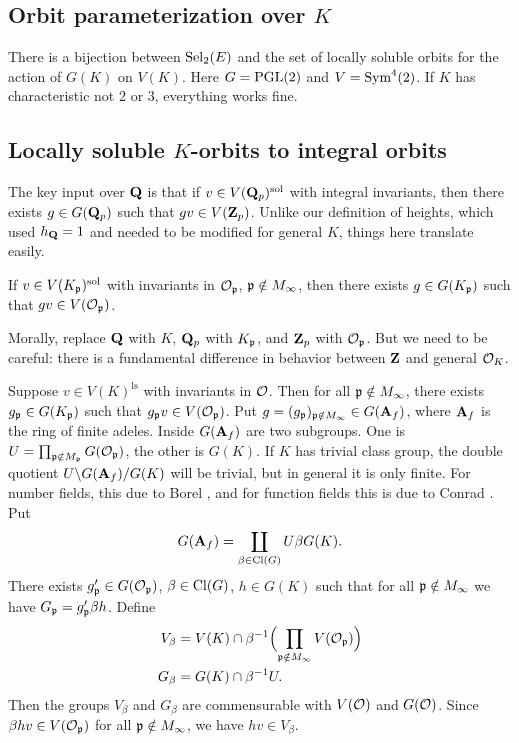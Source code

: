 \subsection{Orbit parameterization over \texorpdfstring{$K$}{K}}

There is a bijection between $\operatorname{Sel}_2(E)$ and the set of locally soluble 
orbits for the action of $G(K)$ on $V(K)$. Here $G=\operatorname{PGL}(2)$ 
and $V=\operatorname{Sym}^4(2)$. If $K$ has characteristic not $2$ or $3$, everything 
works fine. 





\subsection{Locally soluble \texorpdfstring{$K$}{K}-orbits to integral orbits}

The key input over $\mathbf{Q}$ is that if $v\in V(\mathbf{Q}_p)^\mathrm{sol}$ with integral 
invariants, then there exists $g\in G(\mathbf{Q}_p)$ such that $g v\in V(\mathbf{Z}_p)$. 
Unlike our definition of heights, which used $h_{\mathbf{Q}}=1$ and needed to be 
modified for general $K$, things here translate easily. 

\begin{lemm}
If $v\in V(K_{\mathfrak{p}})^\mathrm{sol}$ with invariants in $\mathcal{O}_{\mathfrak{p}}$, 
$\mathfrak{p}\notin M_\infty$, then there exists $g\in G(K_{\mathfrak{p}})$ such that 
$g v\in V(\mathcal{O}_{\mathfrak{p}})$. 
\end{lemm}

Morally, replace $\mathbf{Q}$ with $K$, $\mathbf{Q}_p$ with $K_{\mathfrak{p}}$, and $\mathbf{Z}_p$ with 
$\mathcal{O}_{\mathfrak{p}}$. But we need to be careful: there is a fundamental difference in 
behavior between $\mathbf{Z}$ and general $\mathcal{O}_K$. 

Suppose $v\in V(K)^\mathrm{ls}$ with invariants in $\mathcal{O}$. Then for all 
$\mathfrak{p}\notin M_\infty$, there exists $g_{\mathfrak{p}}\in G(K_{\mathfrak{p}})$ such that 
$g_{\mathfrak{p}} v\in V(\mathcal{O}_{\mathfrak{p}})$. Put $g=(g_{\mathfrak{p}})_{\mathfrak{p}\notin M_\infty}\in G(\mathbf{A}_f)$, 
where $\mathbf{A}_f$ is the ring of finite adeles. Inside $G(\mathbf{A}_f)$ are two 
subgroups. One is $U=\prod_{\mathfrak{p}\notin M_{\mathfrak{p}}} G(\mathcal{O}_{\mathfrak{p}})$, the other is 
$G(K)$. If $K$ has trivial class group, the double quotient 
$U\backslash G(\mathbf{A}_f)/G(K)$ will be trivial, but in general it is only finite. 
For number fields, this due to Borel \cite{b63}, and for function fields this is 
due to Conrad \cite{c12}. Put 
\[
  G(\mathbf{A}_f) = \coprod_{\beta\in \operatorname{Cl}(G)} U \beta G(K) .
\]
There exists $g_{\mathfrak{p}}'\in G(\mathcal{O}_{\mathfrak{p}})$, $\beta\in \operatorname{Cl}(G)$, $h\in G(K)$ such 
that for all $\mathfrak{p}\notin M_\infty$ we have $G_{\mathfrak{p}} = g_{\mathfrak{p}}' \beta h$. Define 
\begin{align*}
  V_\beta &= V(K)\cap \beta^{-1}\Bigl(\prod_{\mathfrak{p}\notin M_\infty} V(\mathcal{O}_{\mathfrak{p}})\Bigr) \\
  G_\beta &= G(K)\cap \beta^{-1} U .
\end{align*}
Then the groups $V_\beta$ and $G_\beta$ are commensurable with 
$V(\mathcal{O})$ and $G(\mathcal{O})$. Since $\beta h v\in V(\mathcal{O}_{\mathfrak{p}})$ for all 
$\mathfrak{p}\notin M_\infty$, we have $h v\in V_\beta$. 

